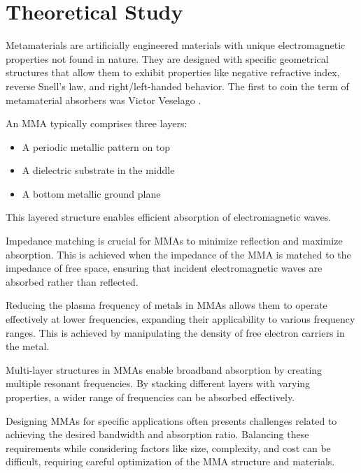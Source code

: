 \section{\textsf{Theoretical Study}}
    Metamaterials are artificially engineered materials with unique electromagnetic properties
    not found in nature. They are designed with specific geometrical structures that allow them
    to exhibit properties like negative refractive index, reverse Snell's law, and right/left-handed
    behavior. The first to coin the term of metamaterial absorbers was Victor Veselago \cite{veselago_left_2006}.
    
    An MMA typically comprises three layers: 
    \begin{itemize}
        \item A periodic metallic pattern on top
        \item A dielectric substrate in the middle
        \item A bottom metallic ground plane
    \end{itemize}
    This layered structure enables efficient absorption of electromagnetic waves.

    Impedance matching is crucial for MMAs to minimize reflection and maximize absorption. 
    This is achieved when the impedance of the MMA is matched to the impedance of free space,
    ensuring that incident electromagnetic waves are absorbed rather than reflected.
    
    Reducing the plasma frequency of metals in MMAs allows them to operate effectively at 
    lower frequencies, expanding their applicability to various frequency ranges. 
    This is achieved by manipulating the density of free electron carriers in the metal.

    Multi-layer structures in MMAs enable broadband absorption by creating multiple resonant
    frequencies. By stacking different layers with varying properties, a wider range of 
    frequencies can be absorbed effectively.


    Designing MMAs for specific applications often presents challenges related to achieving 
    the desired bandwidth and absorption ratio. Balancing these requirements while considering
    factors like size, complexity, and cost can be difficult, requiring careful optimization
    of the MMA structure and materials.